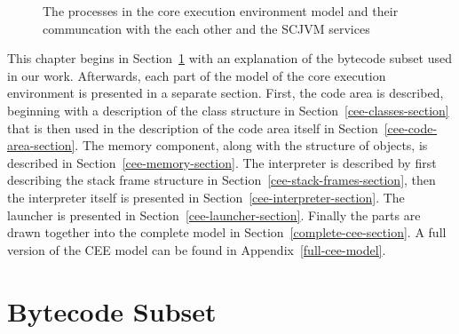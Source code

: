 \begin{figure}[ht]
  \centering
  \caption{The processes in the core execution environment model and
    their communcation with the each other and the SCJVM services}
  \label{cee-model-fig}
\end{figure}

This chapter begins in Section~\ref{cee-assumptions-section} with an
explanation of the bytecode subset used in our work.
Afterwards, each part of the \Circus{} model of the core execution
environment is presented in a separate section.
First, the code area is described, beginning with a description of the
class structure in Section~\ref{cee-classes-section} that is then used
in the description of the code area itself in
Section~\ref{cee-code-area-section}.
The memory component, along with the structure of objects, is
described in Section~\ref{cee-memory-section}.
The interpreter is described by first describing the stack frame
structure in Section~\ref{cee-stack-frames-section}, then the
interpreter itself is presented in
Section~\ref{cee-interpreter-section}.
The launcher is presented in Section~\ref{cee-launcher-section}.
Finally the parts are drawn together into the complete model in
Section~\ref{complete-cee-section}. 
A full version of the CEE model can be found in
Appendix~\ref{full-cee-model}.

\section{Bytecode Subset}
\label{cee-assumptions-section}

